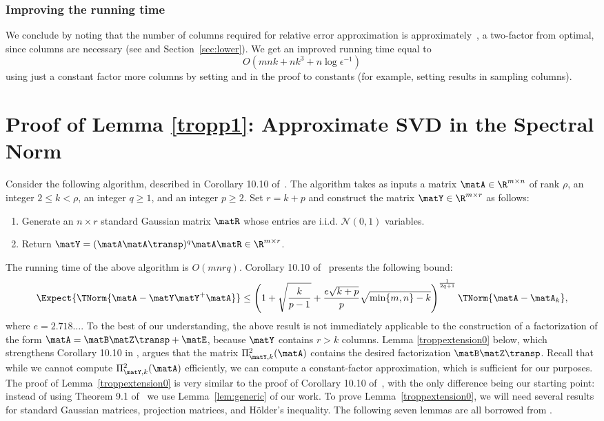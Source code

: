 \subsubsection{Improving the running time}
We conclude by noting that the number of columns required for relative error approximation is approximately~, a
two-factor from optimal, since  columns are necessary (see \cite{DV06} and
Section~\ref{sec:lower}). We get an improved running time equal to $$O\left(mnk+nk^3+n\log\epsilon^{-1}\right)$$ using
just a constant factor more columns by setting
 and  in the proof to constants (for example, setting
 results in sampling
 columns).



\section{Proof of Lemma \ref{tropp1}: Approximate SVD in the Spectral Norm}\label{sec:proofS}
Consider the following algorithm, described in Corollary 10.10 of~\cite{HMT}. The algorithm takes as inputs a matrix $\matA \in \R^{m \times n}$ of rank $\rho$, an integer $2 \leq k <\rho$, an integer $q \geq 1$, and an integer $p \geq 2$. Set $r = k+p$ and construct the matrix
$\matY \in \R^{m \times r}$ as follows:
\begin{enumerate}
\item Generate an $n \times r$ standard Gaussian matrix $\matR$ whose entries are i.i.d. $\mathcal{N}(0,1)$ variables.
\item Return $\matY = (\matA \matA\transp)^q \matA \matR \in \R^{m \times r}$.
\end{enumerate}
The running time of the above algorithm is $ O(mnrq )$.
Corollary 10.10 of~\cite{HMT} presents the following bound:
$$\Expect{\TNorm{\matA - \matY \matY^+ \matA }} \leq
\left(1 + \sqrt{\frac{k}{p-1}} + \frac{e \sqrt{k+p}}{p} \sqrt{ \min\{ m,n\} -k }
\right)^{\frac{1}{2q+1}}\TNorm{\matA - \matA_k},$$
where $e = 2.718\ldots$. To the best of our understanding, the above result is not immediately applicable to the construction of a factorization of the form $\matA =
\matB \matZ\transp + \matE$, because $\matY$ contains $r > k$ columns. Lemma \ref{troppextension0} below, which  strengthens Corollary 10.10 in \cite{HMT}, argues that the matrix $\Pi_{\matY,k}^2(\matA)$ contains the desired factorization $\matB \matZ\transp$. Recall that while we cannot compute $\Pi_{\matY,k}^2(\matA)$ efficiently, we can compute a constant-factor approximation, which is sufficient for our purposes. The proof of Lemma~\ref{troppextension0} is very similar to the proof of Corollary 10.10 of~\cite{HMT}, with the only difference being our starting point: instead of using Theorem 9.1 of~\cite{HMT} we use Lemma~\ref{lem:generic} of our work. To prove Lemma~\ref{troppextension0}, we will
need several results for standard Gaussian matrices,
projection matrices, and H\"{o}lder's inequality.
The following seven lemmas are all borrowed from \cite{HMT}.

